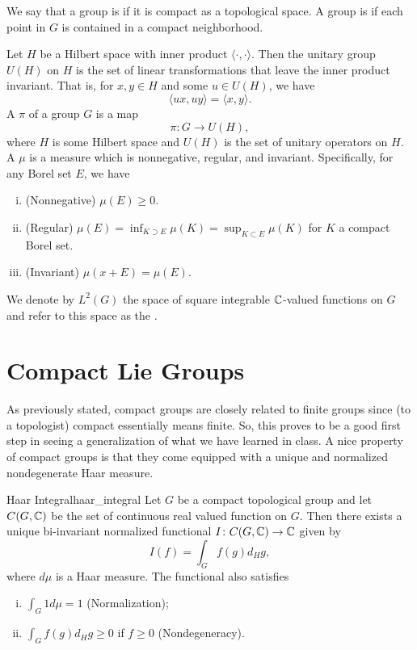 We say that a group is  if it is compact as a topological space. A group is  if each point in $G$ is contained in a compact neighborhood. 

Let $H$ be a Hilbert space with inner product $\langle \cdot,\cdot \rangle$. Then the unitary group $U(H)$ on $H$ is the set of linear transformations that leave the inner product invariant. That is, for $x,y\in H$ and some $u\in U(H)$, we have
\[
\langle ux,uy \rangle = \langle x,y\rangle.
\]
A  $\pi$ of a group $G$ is a map
\[
\pi \colon G \to U(H),
\]
where $H$ is some Hilbert space and $U(H)$ is the set of unitary operators on $H$. A  $\mu$ is a measure which is nonnegative, regular, and invariant. Specifically, for any Borel set $E$, we have
\begin{enumerate}[i.]
    \item (Nonnegative) $\mu(E)\geq 0$.
    \item (Regular) $\mu(E)=\inf_{K\supset E}\mu(K)=\sup_{K\subset E}\mu(K)$ for $K$ a compact Borel set.
    \item (Invariant) $\mu(x+E)=\mu(E)$.
\end{enumerate}
We denote by $L^2(G)$ the space of square integrable $\mathbb{C}$-valued functions on $G$ and refer to this space as the .



\section{Compact Lie Groups}
As previously stated, compact groups are closely related to finite groups since (to a topologist) compact essentially means finite.  So, this proves to be a good first step in seeing a generalization of what we have learned in class.  A nice property of compact groups is that they come equipped with a unique and normalized nondegenerate Haar measure.

\begin{thm}{Haar Integral}{haar_integral}
    Let $G$ be a compact topological group and let $C(G,\mathbb{C})$ be the set of continuous real valued function on $G$.  Then there exists a unique bi-invariant normalized functional $I\colon C(G,\mathbb{C})\to \mathbb{C}$ given by
    \[
    I(f) = \int_G f(g)d_Hg,
    \]
    where $d\mu$ is a Haar measure. The functional also satisfies
    \begin{enumerate}[i.]
        \item $\int_G 1 d\mu=1$ (Normalization);
        \item $\int_G f(g)d_H g \geq 0$ if $f\geq 0$ (Nondegeneracy).
    \end{enumerate}
\end{thm}

